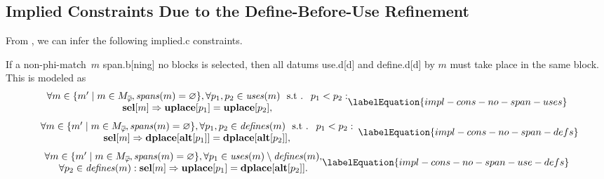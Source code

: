 \subsection{Implied Constraints Due to the Define-Before-Use Refinement}

From , we can infer the
following \gls{implied.c} \glspl{constraint}.

If a non-\gls{phi-match}~$m$ \gls{span.b}[ning] no \glspl{block} is selected,
then all \glspl{datum} \gls{use.d}[d] and \gls{define.d}[d] by $m$ must take
place in the same \gls{block}.
%
This is modeled as
%
\begin{equation}
  \begin{array}{@{}c@{}}
    \forall m \in
      \mSetBuilder{m'}%
                  {%
                    m \in \mPhiMatchCompSet \hspace{-1pt},
                    \mSpans(m) = \mEmptySet
                  },
    \forall p_1, p_2 \in \mUses(m) \text{ \st } p_1 < p_2 : \\
    \mVar{sel}[m] \mImp \mVar{uplace}[p_1] = \mVar{uplace}[p_2],
  \end{array}
  \labelEquation{impl-cons-no-span-uses}
\end{equation}
%
\begin{equation}
  \begin{array}{c}
    \forall m \in
      \mSetBuilder{m'}%
                  {%
                    m \in \mPhiMatchCompSet \hspace{-1pt},
                    \mSpans(m) = \mEmptySet
                  },
    \forall p_1, p_2 \in \mDefines(m) \text{ \st } p_1 < p_2 : \\
    \mVar{sel}[m]
    \mImp
    \mVar{dplace}[\mVar{alt}[p_1]] = \mVar{dplace}[\mVar{alt}[p_2]],
  \end{array}
  \labelEquation{impl-cons-no-span-defs}
\end{equation}
%
\begin{equation}
  \begin{array}{@{}c@{}}
    \forall m \in
      \mSetBuilder{m'}%
                  {%
                    m \in \mPhiMatchCompSet \hspace{-1pt},
                    \mSpans(m) = \mEmptySet
                  },
    \forall p_1 \in \mUses(m) \setminus \mDefines(m), \\
    \forall p_2 \in \mDefines(m) :
    \mVar{sel}[m]
    \mImp
    \mVar{uplace}[p_1] = \mVar{dplace}[\mVar{alt}[p_2]].
  \end{array}
  \labelEquation{impl-cons-no-span-use-defs}
\end{equation}

